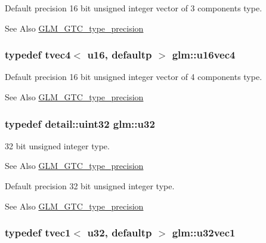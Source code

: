 Default precision 16 bit unsigned integer vector of 3 components type. \begin{DoxySeeAlso}{See Also}
\hyperlink{group__gtc__type__precision}{G\-L\-M\-\_\-\-G\-T\-C\-\_\-type\-\_\-precision} 
\end{DoxySeeAlso}
\hypertarget{group__gtc__type__precision_ga87d1f39c523b4d6d4de0c2778afe5474}{
\subsubsection[{u16vec4}]{\setlength{\rightskip}{0pt plus 5cm}typedef tvec4$<$ u16, defaultp $>$ {\bf glm\-::u16vec4}}}\label{group__gtc__type__precision_ga87d1f39c523b4d6d4de0c2778afe5474}
Default precision 16 bit unsigned integer vector of 4 components type. \begin{DoxySeeAlso}{See Also}
\hyperlink{group__gtc__type__precision}{G\-L\-M\-\_\-\-G\-T\-C\-\_\-type\-\_\-precision} 
\end{DoxySeeAlso}
\hypertarget{group__gtc__type__precision_ga54e837745059fd29017bed71cfa0a8db}{
\subsubsection[{u32}]{\setlength{\rightskip}{0pt plus 5cm}typedef detail\-::uint32 {\bf glm\-::u32}}}\label{group__gtc__type__precision_ga54e837745059fd29017bed71cfa0a8db}
32 bit unsigned integer type. \begin{DoxySeeAlso}{See Also}
\hyperlink{group__gtc__type__precision}{G\-L\-M\-\_\-\-G\-T\-C\-\_\-type\-\_\-precision}
\end{DoxySeeAlso}
Default precision 32 bit unsigned integer type. \begin{DoxySeeAlso}{See Also}
\hyperlink{group__gtc__type__precision}{G\-L\-M\-\_\-\-G\-T\-C\-\_\-type\-\_\-precision} 
\end{DoxySeeAlso}
\hypertarget{group__gtc__type__precision_ga09dd72852808c32ba398674736b9672a}{
\subsubsection[{u32vec1}]{\setlength{\rightskip}{0pt plus 5cm}typedef tvec1$<$ u32, defaultp $>$ {\bf glm\-::u32vec1}}}\label{group__gtc__type__precision_ga09dd72852808c32ba398674736b9672a}
